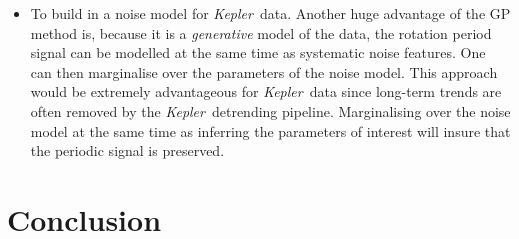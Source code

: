\documentclass[useAMS, usenatbib, preprint, 12pt]{aastex}
\newcommand{\Kepler}{{\it Kepler}}
\newcommand{\kepler}{\Kepler}
\begin{document}
\begin{itemize}
\item{To build in a noise model for \kepler\ data.
Another huge advantage of the GP method is, because it is a {\it generative}
model of the data, the rotation period signal can be modelled at the same time
as systematic noise features.
One can then marginalise over the parameters of the noise model.
This approach would be extremely advantageous for \kepler\ data since
long-term trends are often removed by the \kepler\ detrending pipeline.
Marginalising over the noise model at the same time as inferring the
parameters of interest will insure that the periodic signal is preserved.}
\end{itemize}

\section{Conclusion}
\end{document}
